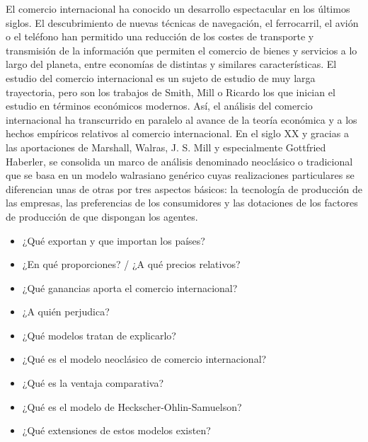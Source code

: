 \documentclass{nuevotema}
\begin{document}
\ideaclave

El comercio internacional ha conocido un desarrollo espectacular en los últimos siglos. El descubrimiento de nuevas técnicas de navegación, el ferrocarril, el avión o el teléfono han permitido una reducción de los costes de transporte y transmisión de la información que permiten el comercio de bienes y servicios a lo largo del planeta, entre economías de distintas y similares características. El estudio del comercio internacional es un sujeto de estudio de muy larga trayectoria, pero son los trabajos de Smith, Mill o Ricardo los que inician el estudio en términos económicos modernos. Así, el análisis del comercio internacional ha transcurrido en paralelo al avance de la teoría económica y a los hechos empíricos relativos al comercio internacional. En el siglo XX y gracias a las aportaciones de Marshall, Walras, J. S. Mill y especialmente Gottfried Haberler, se consolida un marco de análisis denominado neoclásico o tradicional que se basa en un modelo walrasiano genérico cuyas realizaciones particulares se diferencian unas de otras por tres aspectos básicos: la tecnología de producción de las empresas, las preferencias de los consumidores y las dotaciones de los factores de producción de que dispongan los agentes. 


\begin{itemize}
	\item ¿Qué exportan y que importan los países?
	\item ¿En qué proporciones? / ¿A qué precios relativos?
	\item ¿Qué ganancias aporta el comercio internacional?
	\item ¿A quién perjudica?
	\item ¿Qué modelos tratan de explicarlo?
	\item ¿Qué es el modelo neoclásico de comercio internacional?
	\item ¿Qué es la ventaja comparativa?
	\item ¿Qué es el modelo de Heckscher-Ohlin-Samuelson?
	\item ¿Qué extensiones de estos modelos existen?
\end{itemize}

\esquemacorto
\end{document}

